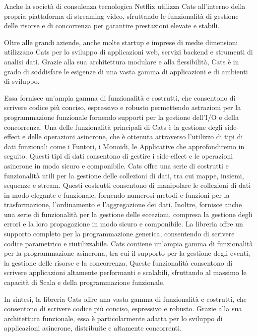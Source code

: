 \noindent Anche la società di consulenza tecnologica Netflix utilizza Cats all'interno della propria piattaforma di streaming video, sfruttando le funzionalità di gestione delle risorse e di concorrenza per garantire prestazioni elevate e stabili.

\noindent Oltre alle grandi aziende, anche molte startup e imprese di medie dimensioni utilizzano Cats per lo sviluppo di applicazioni web, servizi backend e strumenti di analisi dati. Grazie alla sua architettura modulare e alla flessibilità, Cats è in grado di soddisfare le esigenze di una vasta gamma di applicazioni e di ambienti di sviluppo.

\noindent Essa fornisce un'ampia gamma di funzionalità e costrutti, che consentono di scrivere codice più conciso, espressivo e robusto permettendo astrazioni per la programmazione funzionale fornendo supporti per la gestione dell'I/O e della concorrenza. Una delle funzionalità principali di Cats è la gestione degli side-effect e delle operazioni asincrone, che è ottenuta attraverso l'utilizzo di tipi di dati funzionali come i Funtori, i Monoidi, le Applicative che approfondiremo in seguito. Questi tipi di dati consentono di gestire i side-effect e le operazioni asincrone in modo sicuro e componibile. Cats offre una serie di costrutti e funzionalità utili per la gestione delle collezioni di dati, tra cui mappe, insiemi, sequenze e stream. Questi costrutti consentono di manipolare le collezioni di dati in modo elegante e funzionale, fornendo numerosi metodi e funzioni per la trasformazione, l'ordinamento e l'aggregazione dei dati. Inoltre, fornisce anche una serie di funzionalità per la gestione delle eccezioni, compresa la gestione degli errori e la loro propagazione in modo sicuro e componibile. La libreria offre un supporto completo per la programmazione generica, consentendo di scrivere codice parametrico e riutilizzabile. Cats contiene un'ampia gamma di funzionalità per la programmazione asincrona, tra cui il supporto per la gestione degli eventi, la gestione delle risorse e la concorrenza. Queste funzionalità consentono di scrivere applicazioni altamente performanti e scalabili, sfruttando al massimo le capacità di Scala e della programmazione funzionale.

\noindent In sintesi, la libreria Cats offre una vasta gamma di funzionalità e costrutti, che consentono di scrivere codice più conciso, espressivo e robusto. Grazie alla sua architettura funzionale, essa è particolarmente adatta per lo sviluppo di applicazioni asincrone, distribuite e altamente concorrenti.

